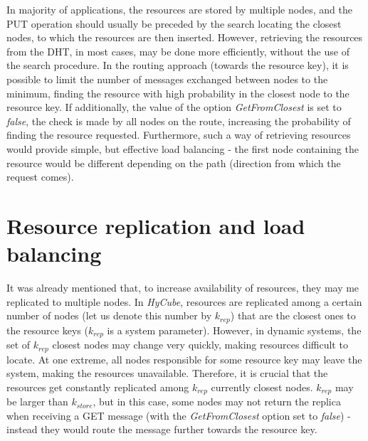 In majority of applications, the resources are stored by multiple nodes, and the PUT operation should usually be preceded by the search locating the closest nodes, to which the resources are then inserted. However, retrieving the resources from the DHT, in most cases, may be done more efficiently, without the use of the search procedure. In the routing approach (towards the resource key), it is possible to limit the number of messages exchanged between nodes to the minimum, finding the resource with high probability in the closest node to the resource key. If additionally, the value of the option \emph{GetFromClosest} is set to \emph{false}, the check is made by all nodes on the route, increasing the probability of finding the resource requested. Furthermore, such a way of retrieving resources would provide simple, but effective load balancing - the first node containing the resource would be different depending on the path (direction from which the request comes).







\section{Resource replication and load balancing}
\label{sec:replication}

It was already mentioned that, to increase availability of resources, they may me replicated to multiple nodes. In \emph{HyCube}, resources are replicated among a certain number of nodes (let us denote this number by $k_{rep}$) that are the closest ones to the resource keys ($k_{rep}$ is a system parameter). However, in dynamic systems, the set of $k_{rep}$ closest nodes may change very quickly, making resources difficult to locate. At one extreme, all nodes responsible for some resource key may leave the system, making the resources unavailable. Therefore, it is crucial that the resources get constantly replicated among $k_{rep}$ currently closest nodes. $k_{rep}$ may be larger than $k_{store}$, but in this case, some nodes may not return the replica when receiving a GET message (with the \emph{GetFromClosest} option set to \emph{false}) - instead they would route the message further towards the resource key. 

